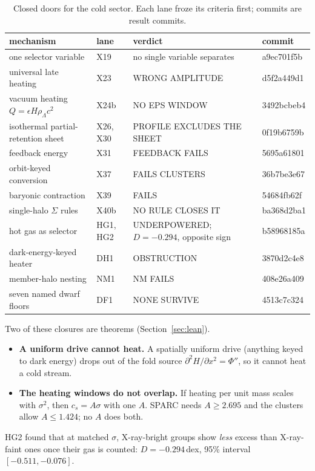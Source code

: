 \documentclass[10pt]{article}
\begin{document}
\begin{table}[t]\centering\small
\caption{Closed doors for the cold sector. Each lane froze its criteria first; commits are result commits.}\label{tab:closed}
\begin{tabular}{>{\raggedright\arraybackslash}p{5.2cm}l>{\raggedright\arraybackslash}p{4.6cm}l}
\toprule
mechanism & lane & verdict & commit\\
\midrule
one selector variable & X19 & no single variable separates & a9ec701f5b\\
universal late heating & X23 & WRONG AMPLITUDE & d5f2a449d1\\
vacuum heating $Q=\epsilon H\rho_\Lambda c^2$ & X24b & NO EPS WINDOW & 3492bcbeb4\\
isothermal partial-retention sheet & X26, X30 & PROFILE EXCLUDES THE SHEET & 0f19b6759b\\
feedback energy & X31 & FEEDBACK FAILS & 5695a61801\\
orbit-keyed conversion & X37 & FAILS CLUSTERS & 36b7be3e67\\
baryonic contraction & X39 & FAILS & 54684fb62f\\
single-halo $\Sigma$ rules & X40b & NO RULE CLOSES IT & ba368d2ba1\\
hot gas as selector & HG1, HG2 & UNDERPOWERED; $D=-0.294$, opposite sign & b58968185a\\
dark-energy-keyed heater & DH1 & OBSTRUCTION & 3870d2c4e8\\
member-halo nesting & NM1 & NM FAILS & 408e26a409\\
seven named dwarf floors & DF1 & NONE SURVIVE & 4513c7c324\\
\end{tabular}
\end{table}

Two of these closures are theorems (Section~\ref{sec:lean}).
\begin{itemize}
\item \textbf{A uniform drive cannot heat.} A spatially uniform drive (anything keyed to dark energy) drops out of the fold source $\partial^2H/\partial x^2=\Phi''$, so it cannot heat a cold stream.
\item \textbf{The heating windows do not overlap.} If heating per unit mass scales with $\sigma^2$, then $c_s=A\sigma$ with one $A$. SPARC needs $A\ge2.695$ and the clusters allow $A\le1.424$; no $A$ does both.
\end{itemize}
HG2 found that at matched $\sigma$, X-ray-bright groups show \emph{less} excess than X-ray-faint ones once their gas is counted: $D=-0.294$\,dex, 95\% interval $[-0.511,-0.076]$.
\end{document}
